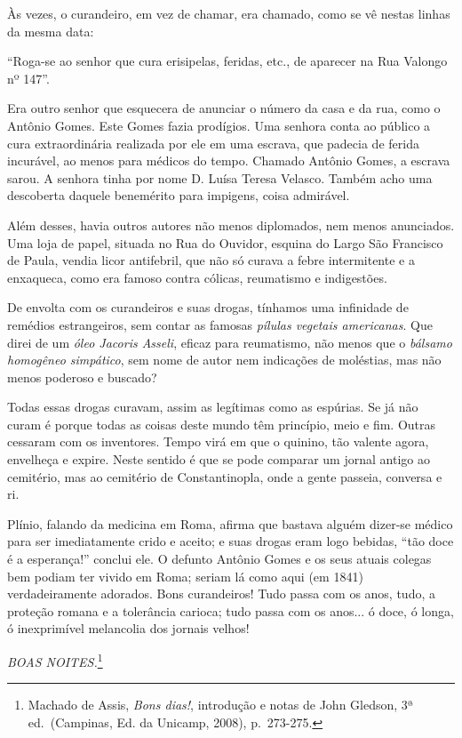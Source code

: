 Às vezes, o curandeiro, em vez de chamar, era chamado, como se vê nestas
linhas da mesma data:

``Roga-se ao senhor que cura erisipelas, feridas, etc., de aparecer na
Rua Valongo nº 147''.

Era outro senhor que esquecera de anunciar o número da casa e da rua,
como o Antônio Gomes. Este Gomes fazia prodígios. Uma senhora conta ao
público a cura extraordinária realizada por ele em uma escrava, que
padecia de ferida incurável, ao menos para médicos do tempo. Chamado
Antônio Gomes, a escrava sarou. A senhora tinha por nome D. Luísa Teresa
Velasco. Também acho uma descoberta daquele benemérito para impigens,
coisa admirável.

Além desses, havia outros autores não menos diplomados, nem menos
anunciados. Uma loja de papel, situada no Rua do Ouvidor, esquina do
Largo São Francisco de Paula, vendia licor antifebril, que não só curava
a febre intermitente e a enxaqueca, como era famoso contra cólicas,
reumatismo e indigestões.

De envolta com os curandeiros e suas drogas, tínhamos uma infinidade de
remédios estrangeiros, sem contar as famosas \emph{pílulas vegetais
americanas}. Que direi de um \emph{óleo Jacoris Asseli}, eficaz para
reumatismo, não menos que o \emph{bálsamo homogêneo simpático}, sem nome
de autor nem indicações de moléstias, mas não menos poderoso e buscado?

Todas essas drogas curavam, assim as legítimas como as espúrias. Se já
não curam é porque todas as coisas deste mundo têm princípio, meio e
fim. Outras cessaram com os inventores. Tempo virá em que o quinino, tão
valente agora, envelheça e expire. Neste sentido é que se pode comparar
um jornal antigo ao cemitério, mas ao cemitério de Constantinopla, onde
a gente passeia, conversa e ri.

Plínio, falando da medicina em Roma, afirma que bastava alguém dizer-se
médico para ser imediatamente crido e aceito; e suas drogas eram logo
bebidas, ``tão doce é a esperança!'' conclui ele. O defunto Antônio
Gomes e os seus atuais colegas bem podiam ter vivido em Roma; seriam lá
como aqui (em 1841) verdadeiramente adorados. Bons curandeiros! Tudo
passa com os anos, tudo, a proteção romana e a tolerância carioca; tudo
passa com os anos... ó doce, ó longa, ó inexprimível melancolia dos
jornais velhos!

\emph{BOAS NOITES.}\footnote{Machado de Assis, \emph{Bons dias!},
  introdução e notas de John Gledson, 3ª ed.~(Campinas, Ed. da Unicamp,
  2008), p.~273-275.}

